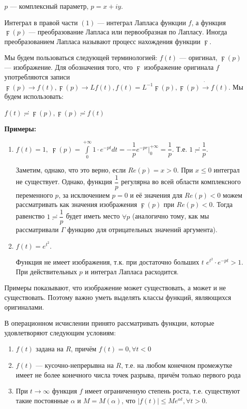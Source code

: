 \documentclass[a4paper, 12pt]{report}
\begin{document}
$p$ --- комплексный параметр, $p = x + iy$.

Интеграл в правой части $(1)$ --- интеграл Лапласа функции $f$, а функция $\digamma(p)$ --- преобразование Лапласа или первообразная по Лапласу. Иногда преобразованием Лапласа называют процесс нахождения функции $\digamma$.

Мы будем пользоваться следующей терминологией: $f(t)$ --- оригинал, $\digamma(p)$ --- изображение. Для обозначения того, что $\digamma$ изображение оригинала $f$ употребляются записи $\digamma(p)\rightarrow f(t), \digamma(p)\rightarrow Lf(t), f(t) = L^{-1}\digamma(p), \digamma(p) \dot{\rightarrow}f(t)$. Мы будем использовать:

\begin{center}
    $f(t) \risingdotseq \digamma(p), \digamma(p) \risingdotseq f(t)$
\end{center}

\textbf{Примеры: }
\begin{enumerate}
    \item $f(t) = 1,\; \digamma(p) = \int\limits_0^{+\infty}1\cdot e^{-pt}dt = -\dfrac{1}{p}e^{-pr}\Bigr|_0^{+\infty} = \dfrac{1}{p}$. \quad Т.е. $1 \risingdotseq \dfrac{1}{p}$.
    
    Заметим, однако, что это верно, если $Re(p) = x > 0$. При $x \leq 0$ интеграл не существует. Однако, функция $\dfrac{1}{p}$ регулярна во всей области комплексного переменного $p$, за исключением $p = 0$ и её значения для $Re(p) < 0$ можем рассматривать как значения изображения $\digamma(p)$ при $Re(p) < 0$. Тогда равенство $1 \risingdotseq \dfrac{1}{p}$ будет иметь место $\forall p$ (аналогично тому, как мы рассматривали $\Gamma$ функцию для отрицательных значений аргумента).
    
    \item $f(t) = e^{t^2}$.
    
    Функция не имеет изображения, т.к. при достаточно больших $t$ $e^{t^2}\cdot e^{-pt} > 1$. При действительных $p$ и интеграл Лапласа расходится.
\end{enumerate}

Примеры показывают, что изображение может существовать, а может и не существовать. Поэтому важно уметь выделять классы функций, являющихся оригиналами.
\par\bigskip
В операционном исчислении принято рассматривать функции, которые удовлетворяют следующим условиям:

\begin{enumerate}
    \item $f(t)$ задана на $R$, причём $f(t) = 0, \forall t < 0$
    \item $f(t)$ --- кусочно-непрерывна на $R$, т.е. на любом конечном промежутке имеет не более конечного числа точек разрыва, причём только первого рода
    \item При $t \rightarrow \infty$ функция $f$ имеет ограниченную степень роста, т.е. существуют такие постоянные $\alpha$ и $M = M(\alpha)$, что $|f(t)| \leq Me^{\alpha t}, \forall t > 0$.
\end{enumerate}
\end{document}

